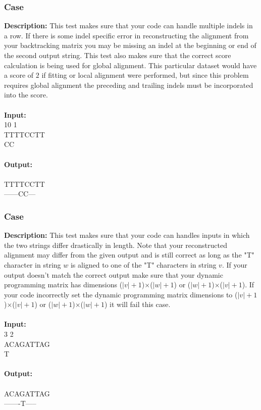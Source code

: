 \documentclass{article}
\newcommand{\code}[1]{{\fontfamily{pcr}\selectfont #1}}
\begin{document}
\subsubsection*{Case }
\hline \vspace{5}
\textbf{Description:} This test makes sure that your code can handle multiple indels in a row. If there is some indel specific error in reconstructing the alignment from your backtracking matrix you may be missing an indel at the beginning or end of the second output string. This test also makes sure that the correct score calculation is being used for global alignment. This particular dataset would have a score of $2$ if fitting or local alignment were performed, but since this problem requires global alignment the preceding and trailing indels must be incorporated into the score.\\ \\
\noindent \textbf{Input:}\\
\code{1 10 1\\TTTTCCTT\\CC}\\ \\
\noindent \textbf{Output:}\\
\code{-4\\TTTTCCTT\\------CC---}

\subsubsection*{Case }
\hline \vspace{5}
\textbf{Description:} This test makes sure that your code can handles inputs in which the two strings differ drastically in length. Note that your reconstructed alignment may differ from the given output and is still correct as long as the "T" character in string $w$ is aligned to one of the "T" characters in string $v$. If your output doesn’t match the correct output make sure that your dynamic programming matrix has dimensions ($|v|+1$)$\times$($|w|+1$) or ($|w|+1$)$\times$($|v|+1$). If your code incorrectly set the dynamic programming matrix dimensions to ($|v|+1$)$\times$($|v|+1$) or ($|w|+1$)$\times$($|w|+1$) it will fail this case.\\ \\
\noindent \textbf{Input:}\\
\code{2 3 2\\ACAGATTAG\\T}\\ \\
\noindent \textbf{Output:}\\
\code{-14\\ACAGATTAG\\-------T-----}
\pagebreak
\end{document}
